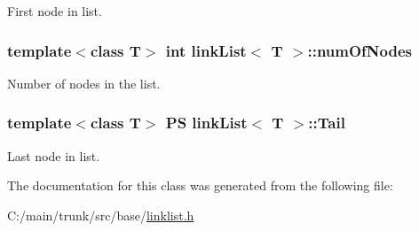 First node in list. \hypertarget{classlink_list_acf1c40918d12e12d58088ea7377c51e8}{
\subsubsection[{numOfNodes}]{\setlength{\rightskip}{0pt plus 5cm}template$<$class T$>$ int {\bf linkList}$<$ T $>$::{\bf numOfNodes}}}
\label{classlink_list_acf1c40918d12e12d58088ea7377c51e8}


Number of nodes in the list. \hypertarget{classlink_list_ad289602de02c0ccdd7fe1b88c987b810}{
\subsubsection[{Tail}]{\setlength{\rightskip}{0pt plus 5cm}template$<$class T$>$ {\bf PS} {\bf linkList}$<$ T $>$::{\bf Tail}}}
\label{classlink_list_ad289602de02c0ccdd7fe1b88c987b810}


Last node in list. 

The documentation for this class was generated from the following file:\begin{DoxyCompactItemize}
\item 
C:/main/trunk/src/base/\hyperlink{linklist_8h}{linklist.h}\end{DoxyCompactItemize}
